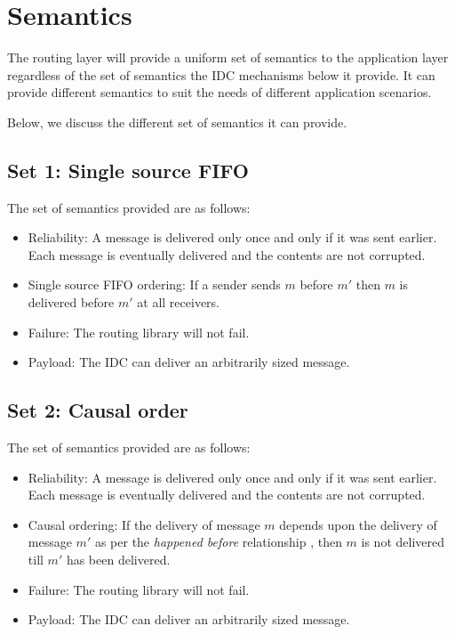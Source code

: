 \documentclass[a4paper,twoside]{report} %
\begin{document}
\section{Semantics}\label{sec:semantics}

The routing layer will provide a uniform set of semantics to the
application layer regardless of the set of semantics the
IDC mechanisms below it provide.
It can provide different semantics to suit the
needs of different application scenarios.

Below, we discuss the different set of semantics it can provide.

\subsection{Set 1: Single source FIFO}
The set of semantics provided are as follows:

\begin{itemize}
\item Reliability:
  A message is delivered only once and only if it was sent earlier.
  Each message is eventually delivered and the contents are not corrupted.
\item Single source FIFO ordering:
  If a sender sends $m$ before $m'$ then $m$ is delivered before $m'$
  at all receivers.
\item Failure:
  The routing library will not fail.
\item Payload:
  The IDC can deliver an arbitrarily sized message.
\end{itemize}

\subsection{Set 2: Causal order}
The set of semantics provided are as follows:

\begin{itemize}
\item Reliability:
  A message is delivered only once and only if it was sent earlier.
  Each message is eventually delivered and the contents are not corrupted.
\item Causal ordering:
  If the delivery of message $m$ depends upon the delivery of message $m'$ as
  per the \emph{happened before} relationship \cite{Lamport:1978:TCO:359545.359563},
  then $m$ is not delivered till $m'$ has been delivered.
\item Failure:
  The routing library will not fail.
\item Payload:
  The IDC can deliver an arbitrarily sized message.
\end{itemize}
\end{document}
